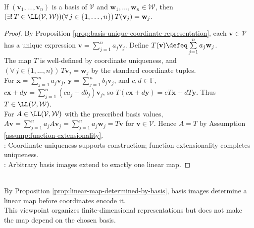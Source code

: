 \begin{proposition} \label{prop:linear-map-determined-by-basis} \\
If $(\mathbf{v}_1,\ldots,\mathbf{v}_n)$ is a basis of $\mathcal{V}$ and $\mathbf{w}_1,\ldots,\mathbf{w}_n\in\mathcal{W}$, then $(\exists!\,T\in\LL(\mathcal{V},\mathcal{W}))(\forall\,j\in\{1,\ldots,n\})\,T(\mathbf{v}_j)=\mathbf{w}_j$.
\begin{proof}
By Proposition \ref{prop:basis-unique-coordinate-representation}, each $\mathbf{v}\in\mathcal{V}$ has a unique expression $\mathbf{v}=\sum\limits_{j=1}^{n}a_j\mathbf{v}_j$. Define $T(\mathbf{v})\defeq\sum\limits_{j=1}^{n}a_j\mathbf{w}_j$.\\
The map $T$ is well-defined by coordinate uniqueness, and $(\forall\,j\in\{1,\ldots,n\})\,T\mathbf{v}_j=\mathbf{w}_j$ by the standard coordinate tuples.\\
For $\mathbf{x}=\sum\limits_{j=1}^{n}a_j\mathbf{v}_j$, $\mathbf{y}=\sum\limits_{j=1}^{n}b_j\mathbf{v}_j$, and $c,d\in\mathbb{F}$, $c\mathbf{x}+d\mathbf{y}=\sum\limits_{j=1}^{n}(ca_j+db_j)\mathbf{v}_j$, so $T(c\mathbf{x}+d\mathbf{y})=cT\mathbf{x}+dT\mathbf{y}$. Thus $T\in\LL(\mathcal{V},\mathcal{W})$.\\
For $A\in\LL(\mathcal{V},\mathcal{W})$ with the prescribed basis values, $A\mathbf{v}=\sum\limits_{j=1}^{n}a_jA\mathbf{v}_j=\sum\limits_{j=1}^{n}a_j\mathbf{w}_j=T\mathbf{v}$ for $\mathbf{v}\in\mathcal{V}$. Hence $A=T$ by Assumption \ref{assump:function-extensionality}.\\
: Coordinate uniqueness supports construction; function extensionality completes uniqueness.\\
: Arbitrary basis images extend to exactly one linear map.
\end{proof}
\end{proposition}

\begin{principle} \\
By Proposition \ref{prop:linear-map-determined-by-basis}, basis images determine a linear map before coordinates encode it.\\
This viewpoint organizes finite-dimensional representations but does not make the map depend on the chosen basis.
\end{principle}
